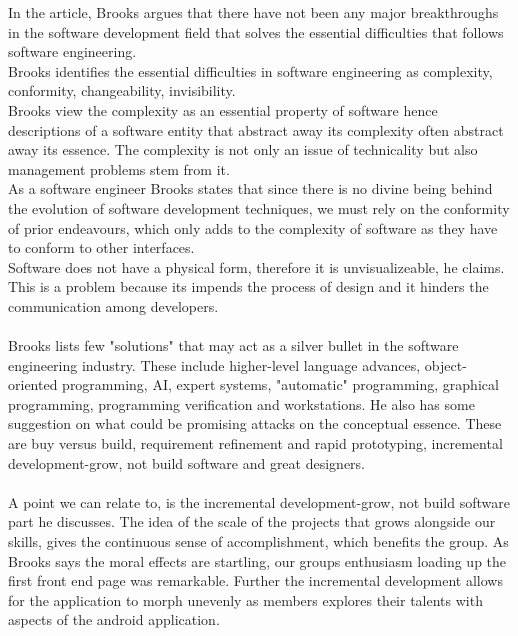 \documentclass[12pt]{article}
\begin{document}
In the article, Brooks argues that there have not been any major breakthroughs in the software development field that solves the essential difficulties that follows software engineering.\\
Brooks identifies the essential difficulties in software engineering as complexity, conformity, changeability, invisibility.\\
Brooks view the complexity as an essential property of software hence descriptions of a software entity that abstract away its complexity often abstract away its essence. The complexity is not only an issue of technicality but also management problems stem from it.\\
As a software engineer Brooks states that since there is no divine being behind the evolution of software development techniques, we must rely on the conformity of prior endeavours, which only adds to the complexity of software as they have to conform to other interfaces.\\
Software does not have a physical form, therefore it is unvisualizeable, he claims. This is a problem because its impends the process of design and it hinders the communication among developers.\\ \\
Brooks lists few "solutions" that may act as a silver bullet in the software engineering industry. These include higher-level language advances, object-oriented programming, AI, expert systems, "automatic" programming, graphical programming, programming verification and workstations. He also has some suggestion on what could be promising attacks on the conceptual essence. These are buy versus build, requirement refinement and rapid prototyping, incremental development-grow, not build software and great designers.\\ \\
A point we can relate to, is the incremental development-grow, not build software part he discusses. The idea of the scale of the projects that grows alongside  our skills, gives the continuous sense of accomplishment, which benefits the group. As Brooks says the moral effects are startling, our groups enthusiasm loading up the first front end page was remarkable. Further the incremental development allows for the application to morph unevenly as members explores their talents with aspects of the android application.\\
\end{document}
